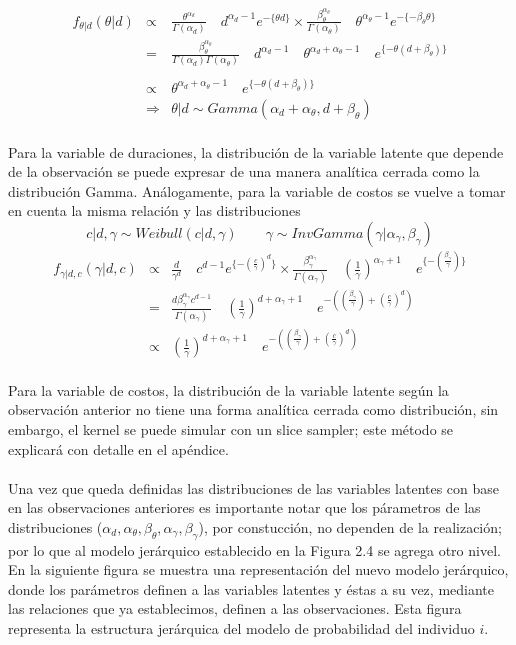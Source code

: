 \begin{eqnarray*}
f_{\theta|d}(\theta|d) &\propto& \frac{\theta^{\alpha_d}}{\Gamma(\alpha_d)}\quad d^{\alpha_d-1} e^{-\{\theta d\}} \times \frac{\beta_\theta^{\alpha_\theta}}{\Gamma(\alpha_\theta)}\quad \theta^{\alpha_\theta-1} e^{-\{-\beta_\theta \theta\}}\\
&=&\frac{\beta_\theta^{\alpha_\theta}}{\Gamma(\alpha_d)\Gamma(\alpha_\theta)} \quad d^{\alpha_d-1} \quad\theta^{\alpha_d+\alpha_\theta-1} \quad e^{\{-\theta(d+\beta_\theta)\}}\\
\\
&\propto& \theta^{\alpha_d+\alpha_\theta-1} \quad e^{\{-\theta(d+\beta_\theta)\}}\\
&\Rightarrow& \theta|d \sim Gamma(\alpha_d+\alpha_\theta,d+\beta_\theta)
\end{eqnarray*}
\\
Para la variable de duraciones, la distribuci\'on de la variable latente que depende de la observaci\'on se puede expresar de una manera anal\'itica cerrada como la distribuci\'on Gamma. An\'alogamente, para la variable de costos se vuelve a tomar en cuenta la misma relaci\'on y las distribuciones 
\[c|d,\gamma \sim Weibull(c|d,\gamma) \qquad \gamma \sim InvGamma(\gamma|\alpha_\gamma,\beta_\gamma)\]
\begin{eqnarray*}
f_{\gamma|d,c}(\gamma|d,c) &\propto& \frac{d}{\gamma^d}\quad c^{d-1} e^{\{-(\frac{c}{\gamma})^d\}} \times \frac{\beta_\gamma^{\alpha_\gamma}}{\Gamma(\alpha_\gamma)}\quad (\frac{1}{\gamma})^{\alpha_\gamma+1} \quad e^{\{-(\frac{\beta_\gamma}{\gamma})\}}\\
&=&\frac{d\beta_\gamma^{\alpha_\gamma} c^{d-1}}{\Gamma(\alpha_\gamma)}\quad (\frac{1}{\gamma})^{d+\alpha_\gamma+1}\quad e^{-((\frac{\beta_\gamma}{\gamma})+(\frac{c}{\gamma})^d)}\\
&\propto&\left(\frac{1}{\gamma}\right)^{d+\alpha_\gamma+1}\quad e^{-((\frac{\beta_\gamma}{\gamma})+(\frac{c}{\gamma})^d)}
\end{eqnarray*}
\\
Para la variable de costos, la distribuci\'on de la variable latente seg\'un la observaci\'on anterior no tiene una forma anal\'itica cerrada como distribuci\'on, sin embargo, el kernel se puede simular con un slice sampler; este m\'etodo se explicar\'a con detalle en el ap\'endice. \\
\\
Una vez que queda definidas las distribuciones de las variables latentes con base en las observaciones anteriores es importante notar que los p\'arametros de las distribuciones ($\alpha_d, \alpha_\theta, \beta_\theta, \alpha_\gamma, \beta_\gamma$), por constucci\'on, no dependen de la realizaci\'on; por lo que al modelo jer\'arquico establecido en la Figura 2.4 se agrega otro nivel. En la siguiente figura se muestra una representaci\'on del nuevo modelo jer\'arquico, donde los par\'ametros definen a las variables latentes y \'estas a su vez, mediante las relaciones que ya establecimos, definen a las observaciones. Esta figura representa la estructura jer\'arquica del modelo de probabilidad del individuo $i$.\\
